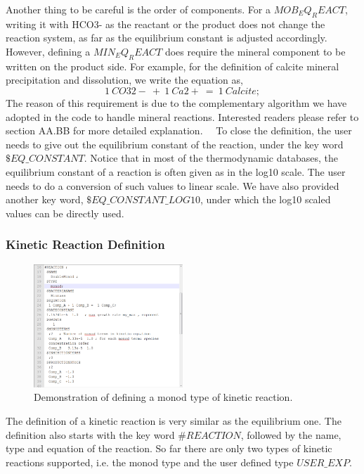 Another thing to be careful is the order of components. For a $MOB_EQ_REACT$, writing it with HCO3- as the reactant or the product does not change the reaction system, as far as the equilibrium constant is adjusted accordingly. However, defining a $MIN_EQ_REACT$ does require the mineral component to be written on the product side. For example, for the definition of calcite mineral precipitation and dissolution, we write the equation as, 
$$ 1 ~ CO32- ~ + ~ 1 ~ Ca2+ ~ = ~ 1 ~ Calcite; $$
The reason of this requirement is due to the complementary algorithm we have adopted in the code to handle mineral reactions. Interested readers please refer to section AA.BB for more detailed explanation. 
~\
To close the definition, the user needs to give out the equilibrium constant of the reaction, under the key word $\$EQ\_CONSTANT$.  Notice that in most of the thermodynamic databases, the equilibrium constant of a reaction is often given as in the log10 scale. The user needs to do a conversion of such values to linear scale. We have also provided another key word, $\$EQ\_CONSTANT\_LOG10$, under which the log10 scaled values can be directly used. 

\subsubsection{Kinetic Reaction Definition}

\begin{figure}
\includegraphics[width=0.5\textwidth]{RT/figs/RT_fig_monod_eq}
\caption{Demonstration of defining a monod type of kinetic reaction. }
\label{fig:RT_fig_monod_eq}
\end{figure}

The definition of a kinetic reaction is very similar as the equilibrium one. The definition also starts with the key word $\#REACTION$, followed by the name, type and equation of the reaction. So far there are only two types of kinetic reactions supported, i.e. the monod type and the user defined type $USER\_EXP$. 

